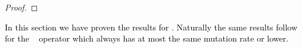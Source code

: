 \documentclass[lettersize,journal]{IEEEtran}
\begin{document}
\begin{proof}
	
\end{proof}

\textcolor{black}{In this section we have proven the results for \linHD. Naturally the same results follow for the \expoHD~ operator which always has at most the same mutation rate or lower.}

%
%	
%	
\end{document}
